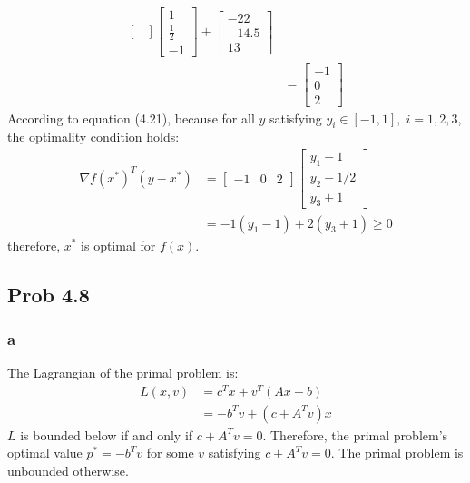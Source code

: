 \message{ !name(ass3_ChangLi.tex)}\documentclass[10pt,a4paper]{article}
\begin{document}
\begin{align*}
\begin{bmatrix}
                  \end{bmatrix}
                             \begin{bmatrix}
                               1\\
                               \frac{1}{2}\\
                               -1
                             \end{bmatrix} +
  \begin{bmatrix}
    -22\\
    -14.5\\
    13
  \end{bmatrix}\\
                &=
                  \begin{bmatrix}
                    -1\\
                    0\\
                    2
                  \end{bmatrix}
\end{align*}
According to equation (4.21)\cite{boyd2004convex}, because for all
$y$ satisfying $y_i \in [-1,1], \; i=1,2,3$, the optimality
condition holds:
\begin{align*}
 \nabla f(x^*)^T(y-x^*)&=\begin{bmatrix}
-1 & 0 & 2
\end{bmatrix}
\begin{bmatrix}
  y_1 - 1\\
  y_2 - 1/2\\
  y_3 + 1
\end{bmatrix}\\
&=
-1(y_1-1)+2(y_3+1)\geq0
\end{align*}
therefore, $x^*$ is optimal for $f(x)$.


\subsection{Prob 4.8}

\subsubsection{a}
The Lagrangian of the primal problem is:
\begin{align*}
  L(x,v) &= c^Tx + v^T(Ax-b)\\
         &= -b^Tv+(c+A^Tv)x
\end{align*}
$L$ is bounded below if and only if $c+A^Tv=0$. Therefore, the
primal problem's optimal value $p^*=-b^Tv$ for some $v$
satisfying $c+A^Tv=0$. The primal problem is unbounded otherwise.
\end{document}

